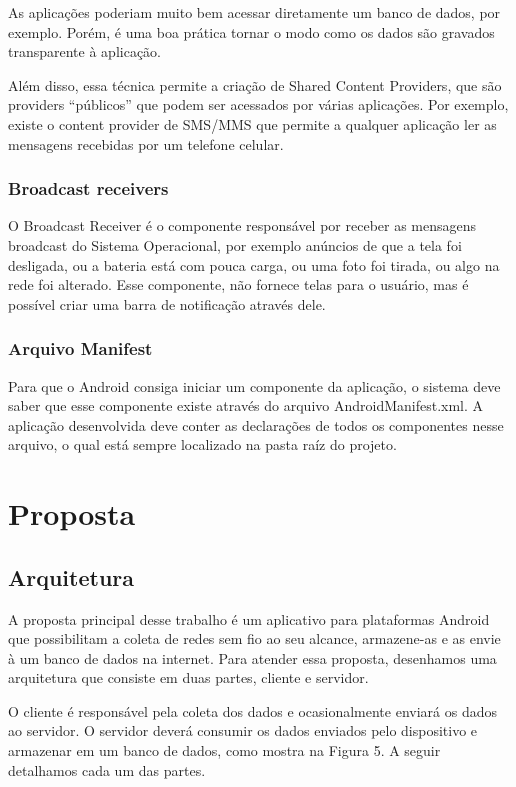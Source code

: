 \documentclass[12pt, %
openright, 
oneside,
a4paper,
brazil]{facom-ufu-abntex2}
\begin{document}
As aplicações poderiam muito bem acessar diretamente um banco de dados, por exemplo. Porém, é uma boa prática tornar o modo como os dados são gravados transparente à aplicação. 

Além disso, essa técnica permite a criação de Shared Content Providers, que são providers “públicos” que podem ser acessados por várias aplicações. Por exemplo, existe o content provider de SMS/MMS que permite a qualquer aplicação ler as mensagens recebidas por um telefone celular.

	\subsection{Broadcast receivers}
	O Broadcast Receiver é o componente responsável por receber as mensagens broadcast do Sistema Operacional, por exemplo anúncios de que a tela foi desligada, ou a bateria está com pouca carga, ou uma foto foi tirada, ou algo na rede foi alterado. Esse componente, não fornece telas para o usuário, mas é possível criar uma barra de notificação através dele.

	\subsection{Arquivo Manifest}
	Para que o Android consiga iniciar um componente da aplicação, o sistema deve saber que esse componente existe através do arquivo AndroidManifest.xml. A aplicação desenvolvida deve conter as declarações de todos os componentes nesse arquivo, o qual está sempre localizado na pasta raíz do projeto.		


\chapter{Proposta}


\section{Arquitetura}
A proposta principal desse trabalho é um aplicativo para plataformas Android que possibilitam a coleta de redes sem fio ao seu alcance, armazene-as e as envie à um banco de dados na internet. Para atender essa proposta, desenhamos uma arquitetura que consiste em duas partes, cliente e servidor.

 O cliente é responsável pela coleta dos dados e ocasionalmente enviará os dados ao servidor. O servidor deverá consumir os dados enviados pelo dispositivo  e armazenar em um banco de dados, como mostra na Figura 5.  A seguir detalhamos cada um das partes.
\end{document}
